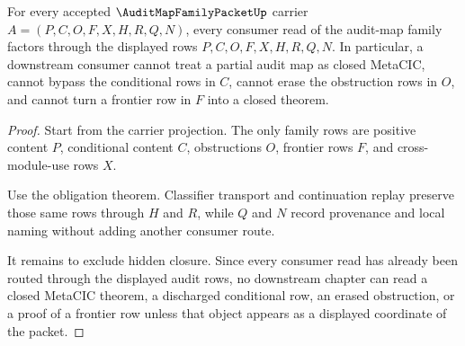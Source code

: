 \begin{theorem}
\label{thm:audit-map-family-packet-frontier-exhaustion}
For every accepted $\AuditMapFamilyPacketUp$ carrier $A=(P,C,O,F,X,H,R,Q,N)$, every consumer read of the audit-map family factors through the displayed rows $P,C,O,F,X,H,R,Q,N$. In particular, a downstream consumer cannot treat a partial audit map as closed MetaCIC, cannot bypass the conditional rows in $C$, cannot erase the obstruction rows in $O$, and cannot turn a frontier row in $F$ into a closed theorem.
\end{theorem}
\begin{proof}
Start from the carrier projection. The only family rows are positive content $P$, conditional content $C$, obstructions $O$, frontier rows $F$, and cross-module-use rows $X$.

Use the obligation theorem. Classifier transport and continuation replay preserve those same rows through $H$ and $R$, while $Q$ and $N$ record provenance and local naming without adding another consumer route.

It remains to exclude hidden closure. Since every consumer read has already been routed through the displayed audit rows, no downstream chapter can read a closed MetaCIC theorem, a discharged conditional row, an erased obstruction, or a proof of a frontier row unless that object appears as a displayed coordinate of the packet.
\end{proof}


\begin{closurestatus}{\AuditMapFamilyPacketUp}
  \theoryclosure{\seedClosure}
  \formalstatus{\unformalizedV}
\end{closurestatus}
